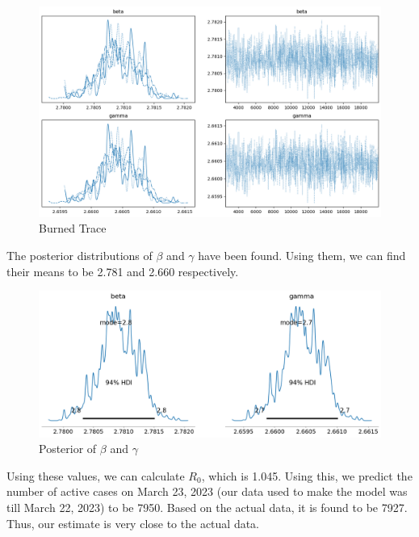 \documentclass[letterpaper,12pt]{report}
\begin{document}
\begin{figure}[H]
    \centering
    \includegraphics[scale = 0.59]{trace_burned.png}
    \caption{Burned Trace}
\end{figure}

\noindent
The posterior distributions of $\beta$ and $\gamma$ have been found. Using them, we can find their means to be 2.781 and 2.660 respectively.

\begin{figure}[H]
    \centering
    \includegraphics[scale = 0.61]{burned_posterior.png}
    \caption{Posterior of $\beta$ and $\gamma$}
\end{figure}

\noindent
Using these values, we can calculate $R_0$, which is 1.045. Using this, we predict the number of active cases on March 23, 2023 (our data used to make the model was till March 22, 2023) to be 7950. Based on the actual data, it is found to be 7927. Thus, our estimate is very close to the actual data.\\
\end{document}
